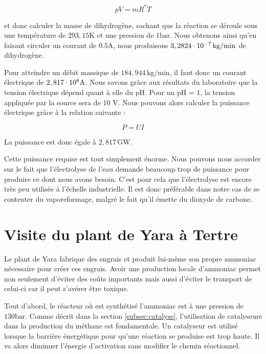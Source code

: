 \documentclass[a4paper, oneside, 12pt]{article}
\begin{document}
\begin{equation*}
	pV = mR^{*}T
\end{equation*}

et donc calculer la masse de dihydrogène, sachant que la réaction se déroule 
sous une température de $293,15 \si{\kelvin}$ et une pression de $1 \si{\bar}$. 
Nous obtenons ainsi qu'en faisant circuler un courant de $0.5 \si{\ampere}$, 
nous produisons $3,2824\cdot 10^{-7} \, \si{\kilo\gram/\minute}$ de dihydrogène.

Pour atteindre un débit massique de $184,944 \, \si{\kilo\gram/\minute}$, 
il faut donc un courant électrique de $2,817\cdot 10^{8} \si{\ampere}$. 
Nous savons grâce aux résultats du laboratoire que la tension électrique dépend quant à elle du pH. 
Pour un pH = 1, la tension appliquée par la source sera de 10 V.
Nous pouvons alors calculer la puissance électrique grâce à la relation suivante : 

\begin{equation*}
	P = UI
\end{equation*}

La puissance est donc égale à $2,817 \, \si{\giga\watt}$.

Cette puissance requise est tout simplement énorme. Nous pouvons nous accorder sur le fait que l'électrolyse de l'eau demande 
beaucoup trop de puissance pour produire ce dont nous avons besoin. 
C'est pour cela que l'électrolyse est encore très peu utilisée à l'échelle industrielle. 
Il est donc préférable dans notre cas de se contenter du vaporeformage, 
malgré le fait qu'il émette du dioxyde de carbone.

\section{Visite du plant de Yara à Tertre}

Le plant de Yara fabrique des engrais et produit lui-même son propre ammoniac nécessaire
pour créer ces engrais. Avoir une production locale d'ammoniac permet non seulement 
d'éviter des coûts importants mais aussi d'éviter le transport de celui-ci car il 
peut s'avérer être toxique.

Tout d'abord, le réacteur où est synthétisé l'ammoniac est à une pression de $130 \si{\bar}$.
Comme décrit dans la section \ref{subsec:catalyse}, l'utilisation de catalyseurs dans la
production du méthane est fondamentale. Un catalyseur est utilisé lorsque la 
barrière énergétique pour qu'une réaction se produise est trop haute. Il va alors 
diminuer l'énergie d'activation sans modifier le chemin réactionnel.
\end{document}
